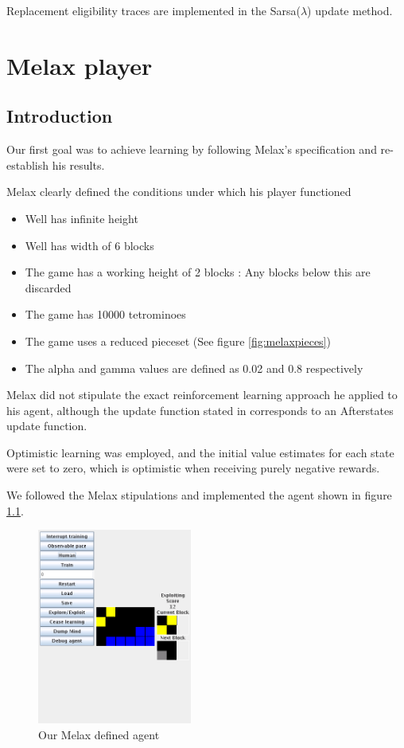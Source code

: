 \documentclass{rucsthesis}
\begin{document}
Replacement eligibility traces are implemented in the Sarsa($\lambda$) update method. 

\chapter{Melax player}

\section{Introduction}

Our first goal was to achieve learning by following Melax's specification and re-establish his results.

Melax clearly defined the conditions under which his player functioned

\begin{itemize}
\item{Well has infinite height}
\item{Well has width of 6 blocks}
\item{The game has a working height of 2 blocks : Any blocks below this are discarded}
\item{The game has 10000 tetrominoes}
\item{The game uses a reduced pieceset (See figure \ref{fig:melaxpieces})}
\item{The alpha and gamma values are defined as 0.02 and 0.8 respectively}
\end{itemize}

Melax did not stipulate the exact reinforcement learning approach he applied to his agent, although the update function stated in \cite{melaxtetris} corresponds to an Afterstates update function.

Optimistic learning was employed, and the initial value estimates for each state were set to zero, which is optimistic when receiving purely negative rewards. 

We followed the Melax stipulations and implemented the agent shown in figure \ref{fig:mymelax}.

\begin{figure}[h]
\centering
\includegraphics[width=2in]{mymelax.png}
\caption{Our Melax defined agent}
\label{fig:mymelax}
\end{figure}
\end{document}
